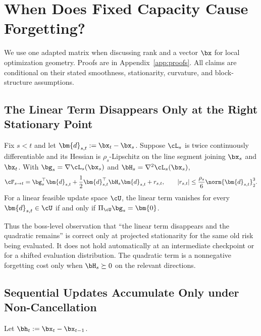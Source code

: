 \section{When Does Fixed Capacity Cause Forgetting?}
\label{sec:theory}

We use one adapted matrix when discussing rank and a vector $\bx$ for local
optimization geometry. Proofs are in Appendix~\ref{app:proofs}. All claims are
conditional on their stated smoothness, stationarity, curvature, and
block-structure assumptions.

\subsection{The Linear Term Disappears Only at the Right Stationary Point}

\begin{lemma}
\label{lem:local-forgetting}
Fix $s<t$ and let $\bm{d}_{s,t}:=\bx_t-\bx_s$. Suppose $\cL_s$ is twice
continuously differentiable and its Hessian is $\rho_s$-Lipschitz on the line
segment joining $\bx_s$ and $\bx_t$. With
$\bg_s=\nabla\cL_s(\bx_s)$ and $\bH_s=\nabla^2\cL_s(\bx_s)$,
\begin{equation}
  \cF_{s\to t}
  =\bg_s^\top\bm{d}_{s,t}
  +\frac12\bm{d}_{s,t}^\top\bH_s\bm{d}_{s,t}+r_{s,t},
  \qquad
  |r_{s,t}|\leq\frac{\rho_s}{6}\norm{\bm{d}_{s,t}}_2^3.
  \label{eq:forgetting-expansion}
\end{equation}
For a linear feasible update space $\cU$, the linear term vanishes for every
$\bm{d}_{s,t}\in\cU$ if and only if
$\Pi_{\cU}\bg_s=\bm{0}$.
\end{lemma}

Thus the boss-level observation that ``the linear term disappears and the
quadratic remains'' is correct only at projected stationarity for the same old
risk being evaluated. It does not hold automatically at an intermediate
checkpoint or for a shifted evaluation distribution. The quadratic term is a
nonnegative forgetting cost only when $\bH_s\succeq0$ on the relevant
directions.

\subsection{Sequential Updates Accumulate Only under Non-Cancellation}

Let $\bh_t:=\bx_t-\bx_{t-1}$.

